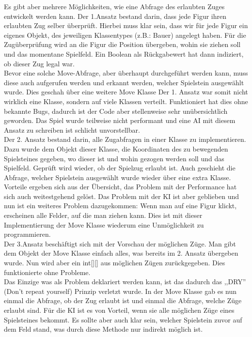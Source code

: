 \documentclass[12pt,a4paper]{article}
\begin{document}
{Es gibt aber mehrere Möglichkeiten, wie eine Abfrage des erlaubten Zuges entwickelt werden kann. Der 1.Ansatz bestand darin, dass jede Figur ihren erlaubten Zug selber überprüft. Hierbei muss klar sein, dass wir für jede Figur ein eigenes Objekt, des jeweiligen Klassentypes (z.B.: Bauer) angelegt haben. Für die Zugüberprüfung wird an die Figur die Position übergeben, wohin sie ziehen soll und das momentane Spielfeld. Ein Boolean als Rückgabewert hat dann indiziert, ob dieser Zug legal war. \\
Bevor eine solche Move-Abfrage, aber überhaupt durchgeführt werden kann, muss diese auch aufgerufen werden und erkannt werden, welcher Spielstein ausgewählt wurde. Dies geschah über eine weitere Move Klasse
Der 1. Ansatz war somit nicht wirklich eine Klasse, sondern auf viele Klassen verteilt. Funktioniert hat dies ohne bekannte Bugs, dadurch ist der Code aber stellenweise sehr unübersichtlich geworden. Das Spiel wurde teilweise nicht performant und eine AI mit diesem Ansatz zu schreiben ist schlicht unvorstellbar. \\[2ex]
Der 2. Ansatz bestand darin, alle Zugabfragen in einer Klasse zu implementieren. Dazu wurde dem Objekt dieser Klasse, die Koordinaten des zu bewegenden Spielsteines gegeben, wo dieser ist und wohin gezogen werden soll und das Spielfeld. Geprüft wird wieder, ob der Spielzug erlaubt ist. Auch geschieht die Abfrage, welcher Spielstein ausgewählt wurde wieder über eine extra Klasse.\\ 
Vorteile ergeben sich aus der Übersicht, das Problem mit der Performance hat sich auch weitestgehend gelöst. Das Problem mit der KI ist aber geblieben und nun ist ein weiteres Problem dazugekommen: Wenn man auf eine Figur klickt, erscheinen alle Felder, auf die man ziehen kann. Dies ist mit dieser Implementierung der Move Klasse wiederum eine Unmöglichkeit zu programmieren.\\[2ex]
Der 3.Ansatz beschäftigt sich mit der Vorschau der möglichen Züge. Man gibt dem Objekt der Move Klasse einfach alles, was bereits im 2. Ansatz übergeben wurde. Nun wird aber ein int[][] aus möglichen Zügen zurückgegeben. Dies funktionierte ohne Probleme. \\
Das Einzige was als Problem deklariert werden kann, ist das dadurch das ,,DRY'' (Don't repeat yourself) Prinzip verletzt wurde. In der Move Klasse gab es nun einmal die Abfrage, ob der Zug erlaubt ist und einmal die Abfrage, welche Züge erlaubt sind. Für die KI ist es von Vorteil, wenn sie alle möglichen Züge eines Spielsteines bekommt. Es sollte aber auch klar sein, welcher Spielstein zuvor auf dem Feld stand, was durch diese Methode nur indirekt möglich ist. \\[2ex]
}
\end{document}
